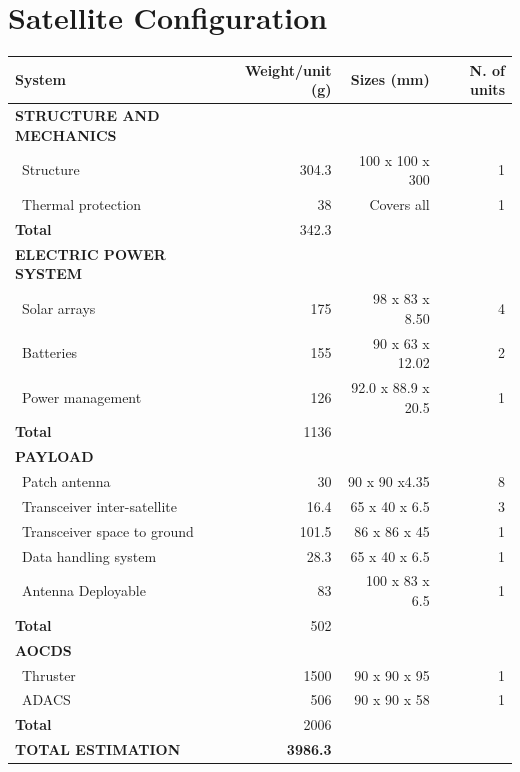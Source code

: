 \clearpage
\section{Satellite Configuration}

\begin{longtable}{| l | r | r | r |}
	\hline
	\rowcolor[gray]{0.80}	\textbf{System}& \textbf{Weight/unit (g)} & \textbf{Sizes (mm)} & \textbf{N. of units}\\
	\hline
	\hline
	\endfirsthead
	
	
	\rowcolor[gray]{0.85} \textbf{STRUCTURE AND MECHANICS} & & & \\ \hline
	
	~Structure & 304.3 & 100 x 100 x 300& 1 \\
	~Thermal protection & 38 & Covers all & 1\\
	\hline 
	\rowcolor[gray]{0.95} \textbf{Total} & 342.3 & &  \\
	\hline \hline
	
	\rowcolor[gray]{0.85} \textbf{ELECTRIC POWER SYSTEM} & & & \\\hline
	
	~Solar arrays & 175 & 98 x 83 x 8.50 & 4 \\
	~Batteries & 155 & 90 x 63 x 12.02 & 2 \\
	~Power management & 126 & 92.0 x 88.9 x 20.5 & 1 \\
	\hline
	\rowcolor[gray]{0.95} \textbf{Total} & 1136 &  &  \\
	\hline \hline
	
	\rowcolor[gray]{0.85} \textbf{PAYLOAD} & & & \\ \hline
	
	~Patch antenna & 30 & 90 x 90 x4.35& 8 \\
	~Transceiver inter-satellite & 16.4 & 65 x 40 x 6.5 & 3 \\
	~Transceiver space to ground & 101.5 & 86 x 86 x 45 & 1 \\
	~Data handling system & 28.3 & 65 x 40 x 6.5 & 1\\
	~Antenna Deployable & 83 & 100 x 83 x 6.5 &1\\
	\hline
	\rowcolor[gray]{0.95} \textbf{Total} & 502 &  & \\
	\hline \hline \hline
	
	\rowcolor[gray]{0.85} \textbf{AOCDS} & & &\\ \hline
	
	~Thruster & 1500 & 90 x 90 x 95 & 1 \\
	~ADACS & 506 & 90 x 90 x 58 & 1 \\
	\hline
	\rowcolor[gray]{0.95} \textbf{Total} & 2006 &  & \\
	\hline \hline
	
	\rowcolor[gray]{0.9} \textbf{TOTAL ESTIMATION} & \textbf{3986.3} & & \\ \hline
	
	
\end{longtable} 
\clearpage

